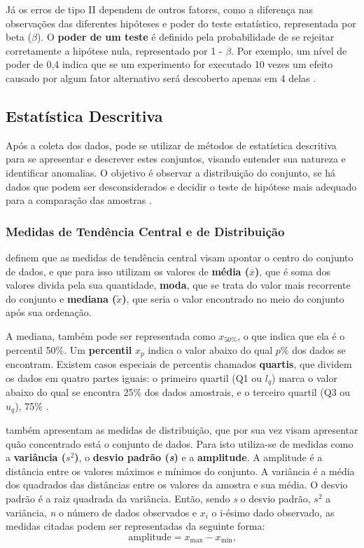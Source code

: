 Já os erros de tipo II dependem de outros fatores, como a diferença nas observações das diferentes hipóteses e poder do teste estatístico, representada por beta (\( \beta \)). O \textbf{poder de um teste} é definido pela probabilidade de se rejeitar corretamente a hipótese nula, representado por 1 - \( \beta \). Por exemplo, um nível de poder de 0,4 indica que se um experimento for executado 10 vezes um efeito causado por algum fator alternativo será descoberto apenas em 4 delas \cite{juristo_basics_2001}.

\subsection{Estatística Descritiva}
\label{subsec:descritiva}

Após a coleta dos dados, pode se utilizar de métodos de estatística descritiva para se apresentar e descrever estes conjuntos, visando entender sua natureza e identificar anomalias. O objetivo é observar a distribuição do conjunto, se há dados que podem ser desconsiderados e decidir o teste de hipótese mais adequado para a comparação das amostras \cite{wohlin_experimentation_2012}.

\subsubsection{Medidas de Tendência Central e de Distribuição}

 definem que as medidas de tendência central visam apontar o centro do conjunto de dados, e que para isso utilizam os valores de \textbf{média (\( \overline{x} \))}, que é soma dos valores divida pela sua quantidade, \textbf{moda}, que se trata do valor mais recorrente do conjunto e \textbf{mediana (\( \tilde{x} \))}, que seria o valor encontrado no meio do conjunto após sua ordenação.

A mediana, também pode ser representada como \(x_{50\%}\), o que indica que ela é o percentil 50\%. Um \textbf{percentil} \(x_p\) indica o valor abaixo do qual \(p\%\) dos dados se encontram. Existem casos especiais de percentis chamados \textbf{quartis}, que dividem os dados em quatro partes iguais: o primeiro quartil (Q1 ou \(l_q\)) marca o valor abaixo do qual se encontra 25\% dos dados amostrais, e o terceiro quartil (Q3 ou \(u_q\)), 75\% \cite{wohlin_experimentation_2012}.

 também apresentam as medidas de distribuição, que por sua vez visam apresentar quão concentrado está o conjunto de dados. Para isto utiliza-se de medidas como a \textbf{variância (\textit{\( s^2 \)})}, o \textbf{desvio padrão (\textit{s})} e a \textbf{amplitude}. A amplitude é a distância entre os valores máximos e mínimos do conjunto. A variância é a média dos quadrados das distâncias entre os valores da amostra e sua média. O desvio padrão é a raiz quadrada da variância. Então, sendo \textit{s} o desvio padrão, \( s^2 \) a variância, \textit{n} o número de dados observados e \(x_i \) o i-ésimo dado observado, as medidas citadas podem ser representadas da seguinte forma:
\[
\text{amplitude} = x_{\text{max}} - x_{\text{min}}\text{,}
\]

